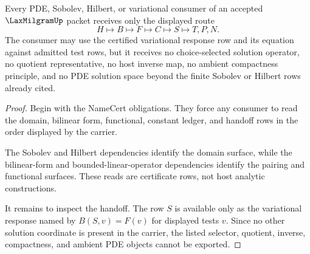 \begin{theorem}
\label{thm:lax-milgram-variational-handoff}
Every PDE, Sobolev, Hilbert, or variational consumer of an accepted $\LaxMilgramUp$ packet receives only the displayed route
$$
H \longmapsto B \longmapsto F \longmapsto C \longmapsto S \longmapsto T,P,N .
$$
The consumer may use the certified variational response row and its equation against admitted test rows, but it receives no choice-selected solution operator, no quotient representative, no host inverse map, no ambient compactness principle, and no PDE solution space beyond the finite Sobolev or Hilbert rows already cited.
\end{theorem}
\begin{proof}
Begin with the NameCert obligations. They force any consumer to read the domain, bilinear form, functional, constant ledger, and handoff rows in the order displayed by the carrier.

The Sobolev and Hilbert dependencies identify the domain surface, while the bilinear-form and bounded-linear-operator dependencies identify the pairing and functional surfaces. These reads are certificate rows, not host analytic constructions.

It remains to inspect the handoff. The row $S$ is available only as the variational response named by $B(S,v)=F(v)$ for displayed tests $v$. Since no other solution coordinate is present in the carrier, the listed selector, quotient, inverse, compactness, and ambient PDE objects cannot be exported.
\end{proof}

